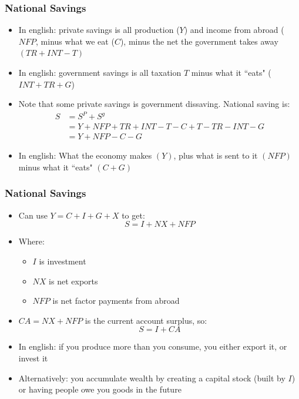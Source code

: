\documentclass{beamer}
\begin{document}
    \begin{frame}
\frametitle[alignment=center]{National Savings}
\begin{itemize}
\item In english:  private savings is all production ($Y$) and income from abroad ($NFP$, minus what we eat ($C$), minus the net the government takes away $(TR+INT-T)$
\item In english: government savings is all taxation $T$ minus what it ``eats" ($INT+TR+G$)
\item Note that some private savings is government dissaving.  National saving is:
\begin{align*}S & =S^P+S^g\\
 & =Y+NFP+TR+INT-T-C+T-TR-INT-G\\ 
 & =Y+NFP-C-G
 \end{align*}
\item In english:  What the economy makes $(Y)$, plus what is sent to it $(NFP)$ minus what it ``eats" $(C+G)$
\end{itemize}
\end{frame}

    \begin{frame}
\frametitle[alignment=center]{National Savings}
\begin{itemize}
\item Can use $Y=C+I+G+X$ to get:
$$S=I+NX+NFP$$
\item Where:
\begin{itemize}
\item $I$ is investment
\item $NX$ is net exports
\item $NFP$ is net factor payments from abroad
\end{itemize}
\item $CA=NX+NFP$ is the current account surplus, so:
$$S=I+CA$$
\item In english:  if you produce more than you consume, you either export it, or invest it
\bigskip
\item Alternatively:  you accumulate wealth by creating a capital stock (built by $I$) or having people owe you goods in the future
\end{itemize}
\end{frame}
\end{document}
